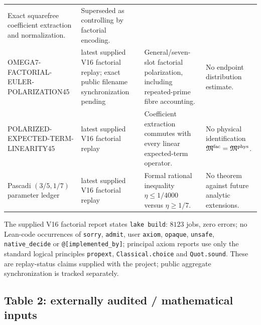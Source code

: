 \documentclass[11pt]{article}
\theoremstyle{definition}
\newcommand{\1}{\mathbf 1}
\begin{document}
{\begin{longtable}{p{}p{}p{}p{}}
Exact squarefree coefficient extraction and normalization. &
Superseded as controlling by factorial encoding.\\
\parbox[t]{0.19\textwidth}{\raggedright\scriptsize\ttfamily OMEGA7-FACTORIAL-\\EULER-\\POLARIZATION45} &
latest supplied V16 factorial replay; exact public filename synchronization pending &
General/seven-slot factorial polarization, including repeated-prime fibre accounting. &
No endpoint distribution estimate.\\
\parbox[t]{0.19\textwidth}{\raggedright\scriptsize\ttfamily POLARIZED-\\EXPECTED-TERM-\\LINEARITY45} &
latest supplied V16 factorial replay &
Coefficient extraction commutes with every linear expected-term operator. &
No physical identification $\mathfrak M^{\rm fac}=\mathfrak M^{\rm phys}$.\\
Pascadi $(3/5,1/7)$ parameter ledger &
latest supplied V16 factorial replay &
Formal rational inequality $\eta\le1/4000$ versus $\eta\ge1/7$. &
No theorem against future analytic extensions.\\
\bottomrule
\end{longtable}

The supplied V16 factorial report states \texttt{lake build}: $8123$ jobs, zero errors; no
Lean-code occurrences of \texttt{sorry}, \texttt{admit}, user \texttt{axiom},
\texttt{opaque}, \texttt{unsafe}, \texttt{native\_decide} or
\texttt{@[implemented\_by]}; principal axiom reports use only the standard logical
principles \texttt{propext}, \texttt{Classical.choice} and \texttt{Quot.sound}.
These are replay-status claims supplied with the project; public aggregate synchronization
is tracked separately.

\subsection{Table 2: externally audited / mathematical inputs}

}
\end{document}
